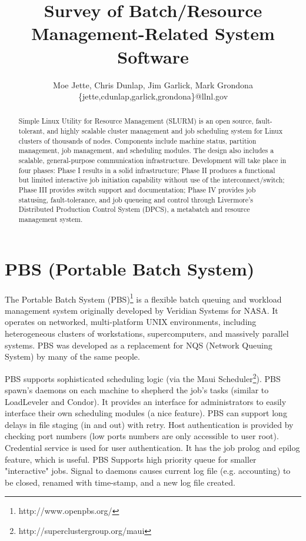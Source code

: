 \documentclass{article}
\author{Moe Jette, Chris Dunlap, Jim Garlick, Mark Grondona\\
        \{jette,cdunlap,garlick,grondona\}@llnl.gov}
\title{Survey of Batch/Resource Management-Related System Software}
\begin{document}
\maketitle

\begin{abstract}
Simple Linux Utility for Resource Management (SLURM) is an open source,
fault-tolerant, and highly scalable cluster management and job 
scheduling system for Linux clusters of 
thousands of nodes.  Components include machine status, partition
management, job management, and scheduling modules.  The design also 
includes a scalable, general-purpose communication infrastructure.
Development will take place in four phases:  Phase I results in a solid
infrastructure;  Phase II produces a functional but limited interactive 
job initiation capability without use of the interconnect/switch; 
Phase III provides switch support and documentation; Phase IV provides 
job statusing, fault-tolerance, and job queueing and control through  
Livermore's Distributed Production Control System (DPCS), a metabatch and
resource management system.
\end{abstract}

\vspace{0.25in}

\section{PBS (Portable Batch System)}

The Portable Batch System (PBS)\footnote{http://www.openpbs.org/}
is a flexible batch queuing and 
workload management system originally developed by Veridian Systems 
for NASA.  It operates on networked, multi-platform UNIX environments, 
including heterogeneous clusters of workstations, supercomputers, and 
massively parallel systems. PBS was developed as a replacement for 
NQS (Network Queuing System) by many of the same people.

PBS supports sophisticated scheduling logic (via the Maui 
Scheduler\footnote{http://superclustergroup.org/maui}). 
PBS spawn's daemons on each 
machine to shepherd the job's tasks (similar to LoadLeveler 
and Condor). It provides an interface for administrators to easily 
interface their own scheduling modules (a nice feature).  PBS can support 
long delays in file staging (in and out) with retry.  Host 
authentication is provided by checking port numbers (low ports numbers are only 
accessible to user root).  Credential service is used for user authentication. 
It has the job prolog and epilog feature, which is useful.  PBS Supports 
high priority queue for smaller "interactive" jobs.  Signal to daemons 
causes current log file (e.g. accounting) to be closed, renamed with 
time-stamp, and a new log file created.
\end{document}
